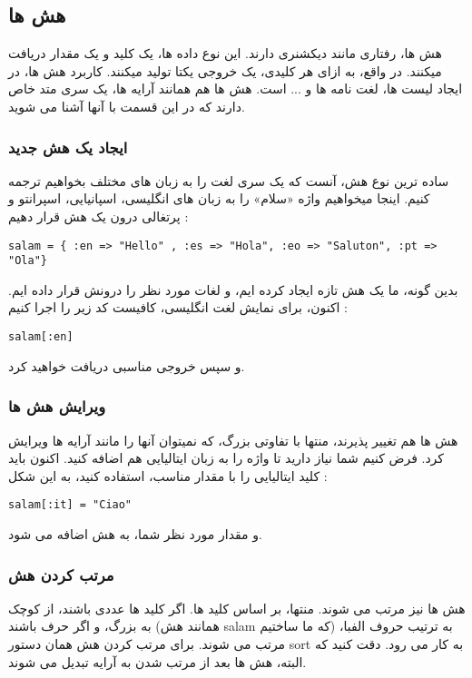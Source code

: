 \documentclass[11pt]{article}
\begin{document}
\subsection{هش ها}
هش ها، رفتاری مانند دیکشنری دارند. این نوع داده ها، یک کلید
و یک مقدار
دریافت میکنند. در واقع، به ازای هر کلیدی، یک خروجی یکتا تولید میکنند. کاربرد هش ها، در ایجاد لیست ها، لغت نامه ها و ... است. هش ها هم همانند آرایه ها، یک سری متد خاص دارند که در این قسمت با آنها آشنا می شوید. 
\subsubsection{ایجاد یک هش جدید}
ساده ترین نوع هش، آنست که یک سری لغت را به زبان های مختلف بخواهیم ترجمه کنیم. اینجا میخواهیم واژه «سلام» را به زبان های انگلیسی، اسپانیایی، اسپرانتو و پرتغالی درون یک هش قرار دهیم :
\begin{latin}
\begin{verbatim}
salam = { :en => "Hello" , :es => "Hola", :eo => "Saluton", :pt => "Ola"}
\end{verbatim}
\end{latin}
بدین گونه، ما یک هش تازه ایجاد کرده ایم، و لغات مورد نظر را درونش قرار داده ایم. اکنون، برای نمایش لغت انگلیسی، کافیست کد زیر را اجرا کنیم :
\begin{latin}
\begin{verbatim}
salam[:en]
\end{verbatim}
\end{latin}
و سپس خروجی مناسبی دریافت خواهید کرد. 
\subsubsection{ویرایش هش ها}
هش ها هم تغییر پذیرند، منتها با تفاوتی بزرگ، که نمیتوان آنها را مانند آرایه ها ویرایش کرد. فرض کنیم شما نیاز دارید تا واژه را به زبان ایتالیایی هم اضافه کنید. اکنون باید کلید ایتالیایی را با مقدار مناسب، استفاده کنید، به این شکل :
\begin{latin}
\begin{verbatim}
salam[:it] = "Ciao"
\end{verbatim}
\end{latin}
و مقدار مورد نظر شما، به هش اضافه می شود. 
\subsubsection{مرتب کردن هش}
هش ها نیز مرتب می شوند. منتها، بر اساس کلید ها. اگر کلید ها عددی باشند، از کوچک به بزرگ، و اگر حرف باشند (همانند هش salam که ما ساختیم) به ترتیب حروف الفبا، مرتب می شوند. برای مرتب کردن هش همان دستور sort به کار می رود. دقت کنید که البته، هش ها بعد از مرتب شدن به آرایه تبدیل می شوند. 
\end{document}
